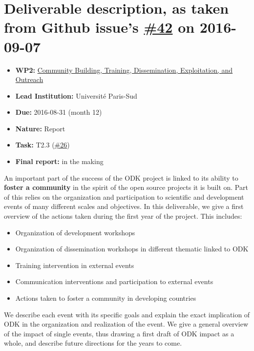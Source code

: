 \section*{\texorpdfstring{Deliverable description, as taken from Github
issue's
\href{https://github.com/OpenDreamKit/OpenDreamKit/issues/42}{\#42} on
2016-09-07}{Deliverable description, as taken from Github issue's \#42 on 2016-09-07}}\label{deliverable-description-as-taken-from-github-issues-42-on-2016-09-07}

\begin{itemize}
\tightlist
\item
  \textbf{WP2:}
  \href{https://github.com/OpenDreamKit/OpenDreamKit/tree/master/WP2}{Community
  Building, Training, Dissemination, Exploitation, and Outreach}
\item
  \textbf{Lead Institution:} Université Paris-Sud
\item
  \textbf{Due:} 2016-08-31 (month 12)
\item
  \textbf{Nature:} Report
\item
  \textbf{Task:} T2.3
  (\href{https://github.com/OpenDreamKit/OpenDreamKit/issues/26}{\#26})
\item
  \textbf{Final report:} in the making
\end{itemize}

An important part of the success of the ODK project is linked to its
ability to \textbf{foster a community} in the spirit of the open source
projects it is built on. Part of this relies on the organization and
participation to scientific and development events of many different
scales and objectives. In this deliverable, we give a first overview of
the actions taken during the first year of the project. This includes:

\begin{itemize}
\tightlist
\item
  Organization of development workshops
\item
  Organization of dissemination workshops in different thematic linked
  to ODK
\item
  Training intervention in external events
\item
  Communication interventions and participation to external events
\item
  Actions taken to foster a community in developing countries
\end{itemize}

We describe each event with its specific goals and explain the exact
implication of ODK in the organization and realization of the event. We
give a general overview of the impact of single events, thus drawing a
first draft of ODK impact as a whole, and describe future directions for
the years to come.
